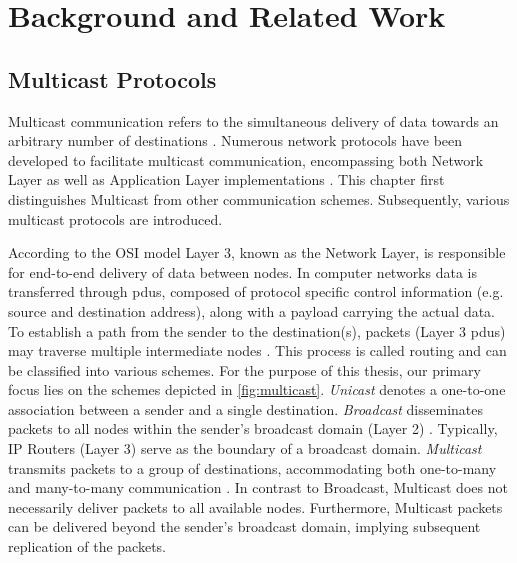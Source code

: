\chapter{Background and Related Work} %
\label{chap:Background and Work}


\section{Multicast Protocols} %
\label{sec:Mutlicast Protocols}
Multicast communication refers to the simultaneous delivery of data towards an
    arbitrary number of destinations
    \cite{mc_routing_multimedia, mc_comm_multicomputer}.
Numerous network protocols have been developed to facilitate multicast
communication, encompassing both Network Layer as well as Application Layer
    implementations \cite{universal_mc, overlay_mc_routing}.
This chapter first distinguishes Multicast from other communication schemes.
Subsequently, various multicast protocols are introduced.

According to the OSI model \cite{osi1980} Layer 3, known as the Network Layer,
    is responsible for end-to-end delivery of data between nodes.
In computer networks data is transferred through \glspl{pdu}, composed of
    protocol specific control information (e.g. source and destination
    address), along with a payload carrying the actual data.
To establish a path from the sender to the destination(s), packets (Layer 3
    \glspl{pdu}) may traverse multiple intermediate nodes \cite{rfc791_ip}.
This process is called routing and can be classified into various schemes.
For the purpose of this thesis, our primary focus lies on the schemes depicted
    in \autoref{fig:multicast}.
\textit{Unicast} denotes a one-to-one association between a sender and a single
    destination.
\textit{Broadcast} disseminates packets to all nodes within the sender's
    broadcast domain (Layer 2) \cite{broadcast}.
Typically, IP Routers (Layer 3) serve as the boundary of a broadcast domain.
\textit{Multicast} transmits packets to a group of destinations, accommodating
    both one-to-many and many-to-many communication \cite{rfc1112_ip4mc}.
In contrast to Broadcast, Multicast does not necessarily deliver packets to all
    available nodes.
Furthermore, Multicast packets can be delivered beyond the sender's broadcast 
    domain, implying subsequent replication of the packets.


